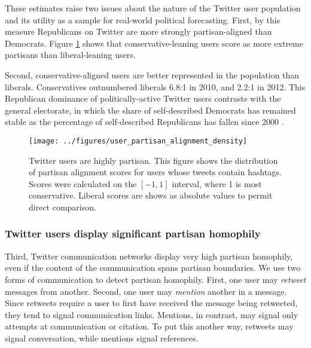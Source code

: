 \documentclass{article}
\begin{document}
These estimates raise two issues about the nature of the Twitter
user population and its utility as a sample for real-world political
forecasting. First, by this measure Republicans on Twitter are more
strongly partisan-aligned than Democrats. Figure
\ref{fig:user-pscore-distribution} shows that conservative-leaning
users score as more extreme partisans than liberal-leaning users.

Second, conservative-aligned users are better represented in the
population than liberals. Conservatives outnumbered liberals 6.8:1 in
2010, and 2.2:1 in 2012. This Republican dominance of
politically-active Twitter users contrasts with the general electorate,
in which the share of self-described Democrats has remained stable as
the percentage of self-described Republicans has fallen since 2000
\cite{pew2012}.



\begin{figure}[ht]
  \centering
  \texttt{[image: ../figures/user\_partisan\_alignment\_density]}
  \caption{Twitter users are highly partisan. This figure shows the distribution of partisan alignment
    scores for users whose tweets contain hashtags. Scores were
    calculated on the $[-1 , 1]$ interval, where 1 is most
    conservative. Liberal scores are shows as absolute values to permit direct comparison.}
  \label{fig:user-pscore-distribution}
\end{figure}




\subsubsection{Twitter users display significant partisan homophily}
\label{sec:twitt-users-displ}

Third, Twitter communication networks display very high partisan
homophily, even if the content of the communication spans partisan
boundaries. We use two forms of communication to detect partisan
homophily. First, one user may \textit{retweet} messages from
another. Second, one user may \textit{mention} another in a
message. Since retweets require a user to first have received the
message being retweeted, they tend to signal communication
links. Mentions, in contrast, may signal only attempts at
communication or citation. To put this another way, retweets may
signal conversation, while mentions signal references.
\end{document}
